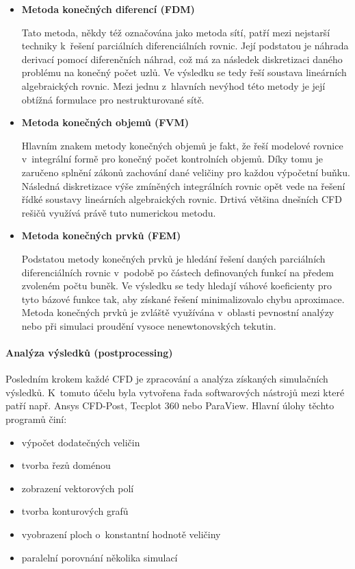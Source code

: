 \begin{itemize}[itemsep=0pt,parsep=0pt,partopsep=0pt,topsep=0pt]
  \item \textbf{Metoda konečných diferencí (FDM)}
  
  Tato metoda, někdy též označována jako metoda sítí, patří mezi nejstarší techniky k~řešení parciálních diferenciálních rovnic. Její podstatou je náhrada derivací pomocí diferenčních náhrad, což má za následek diskretizaci daného problému na konečný počet uzlů. Ve výsledku se tedy řeší soustava lineárních algebraických rovnic. Mezi jednu z~hlavních nevýhod této metody je její obtížná formulace pro nestrukturované sítě. 
  \item \textbf{Metoda konečných objemů (FVM)}
  
  Hlavním znakem metody konečných objemů je fakt, že řeší modelové rovnice v~integrální formě pro konečný počet kontrolních objemů. Díky tomu je zaručeno splnění zákonů zachování dané veličiny pro každou výpočetní buňku. Následná diskretizace výše zmíněných integrálních rovnic opět vede na řešení řídké soustavy lineárních algebraických rovnic. Drtivá většina dnešních CFD rešičů využívá právě tuto numerickou metodu. 
  
  \item \textbf{Metoda konečných prvků (FEM)}
  
  Podstatou metody konečných prvků je hledání řešení daných parciálních diferenciálních rovnic v~podobě po částech definovaných funkcí na předem zvoleném počtu buněk. Ve výsledku se tedy hledají váhové koeficienty pro tyto bázové funkce tak, aby získané řešení minimalizovalo chybu aproximace. Metoda konečných prvků je zvláště využívána v~oblasti pevnostní analýzy nebo při simulaci proudění vysoce nenewtonovských tekutin.  
\end{itemize}

\paragraph{Analýza výsledků (postprocessing)}
Posledním krokem každé CFD je zpracování a analýza získaných simulačních výsledků. K~tomuto účelu byla vytvořena řada softwarových nástrojů mezi které patří např. Ansys CFD-Post, Tecplot 360 nebo ParaView. Hlavní úlohy těchto programů činí:

\begin{itemize}[itemsep=0pt,parsep=0pt,partopsep=0pt,topsep=0pt]
  \item výpočet dodatečných veličin
  \item tvorba řezů doménou
  \item zobrazení vektorových polí
  \item tvorba konturových grafů
  \item vyobrazení ploch o~konstantní hodnotě veličiny
  \item paralelní porovnání několika simulací
\end{itemize}

